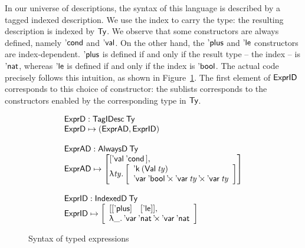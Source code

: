 In our universe of descriptions, the syntax of this language is
described by a tagged indexed description. We use the index to carry
the type: the resulting description is indexed by $\Ty$. We observe
that some constructors are always defined, namely $\SYMBEcond$ and
$\SYMBEval$. On the other hand, the $\SYMBEplus$ and $\SYMBEle$
constructors are index-dependent. $\SYMBEplus$ is defined if and only
if the result type -- the index -- is $\Enat$, whereas $\SYMBEle$ is
defined if and only if the index is $\Ebool$. The actual code
precisely follows this intuition, as shown in
Figure~\ref{fig:hexpr-full}. The first element of $\HExprID$
corresponds to this choice of constructor: the sublists corresponds to
the constructors enabled by the corresponding type in $\Ty$.

\begin{figure}

\[\stk{
\stk{
\HExprD : \TagIDesc{\Ty} \\
\HExprD \mapsto ( \HExprAD , \HExprID ) \\
} \\
\\
\stk{
\HExprAD : \ATagIDesc{\Ty} \\
\HExprAD \mapsto \vtup{l}{
                   {\sqr{\SYMBEval\: \SYMBEcond \,}} \red{,} \\
                   \LAM{\V{ty}}
                   \bigRedBracket{
                   \begin{array}{l}
                   \DConst{(\Val{\V{ty}})} \\
                   \DProd{\DVar{\Ebool}}{\DProd{\DVar{\V{ty}}}{\DVar{\V{ty}}}}
                   \end{array}
                   }
                 }
\\
\\
} 
\\
\stk{
\HExprID : \ITagIDesc{\Ty} \\
\HExprID \mapsto \bigRedBracket{
                 \begin{array}{l}
                   \sqr{\sqr{\SYMBEplus} \quad \sqr{\SYMBEle}} \red{,} \\
                   \LAM{\_} \DProd{\DVar{\Enat}}{\DVar{\Enat}} 
                   \end{array}
                   }
}
}\]

\caption{Syntax of typed expressions}
\label{fig:hexpr-full}

\end{figure}

